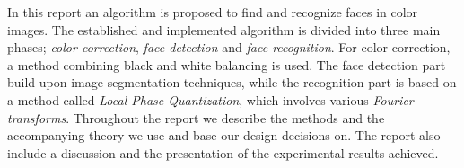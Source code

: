 In this report an algorithm is proposed to find and recognize faces in color images. The established and implemented algorithm is divided into three main phases; \textit{color correction}, \textit{face detection} and \textit{face recognition}. For color correction, a method combining black and white balancing is used. The face detection part build upon image segmentation techniques, while the recognition part is based on a method called \textit{Local Phase Quantization}, which involves various \textit{Fourier transforms}. Throughout the report we describe the methods and the accompanying theory we use and base our design decisions on. The report also include a discussion and the presentation of the experimental results achieved. 
